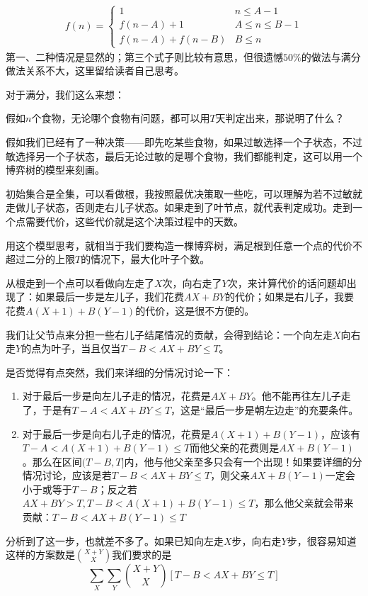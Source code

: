 \documentclass{ctexart}
\begin{document}
\begin{eqnarray*}
f(n) =
\begin{cases}
1 & n \le A-1 \\
f(n-A)+1 & A \le n \le B-1 \\
f(n-A)+f(n-B) & B \le n
\end{cases}
\end{eqnarray*}
第一、二种情况是显然的；第三个式子则比较有意思，但很遗憾$50\%$的做法与满分做法关系不大，这里留给读者自己思考。

对于满分，我们这么来想：

假如$n$个食物，无论哪个食物有问题，都可以用$T$天判定出来，那说明了什么？

假如我们已经有了一种决策——即先吃某些食物，如果过敏选择一个子状态，不过敏选择另一个子状态，最后无论过敏的是哪个食物，我们都能判定，这可以用一个博弈树的模型来刻画。

初始集合是全集，可以看做根，我按照最优决策取一些吃，可以理解为若不过敏就走做儿子状态，否则走右儿子状态。如果走到了叶节点，就代表判定成功。走到一个点需要代价，这些代价就是这个决策过程中的天数。

用这个模型思考，就相当于我们要构造一棵博弈树，满足根到任意一个点的代价不超过二分的上限$T$的情况下，最大化叶子个数。

从根走到一个点可以看做向左走了$X$次，向右走了$Y$次，来计算代价的话问题却出现了：如果最后一步是左儿子，我们花费$AX+BY$的代价；如果是右儿子，我要花费$A(X+1)+B(Y-1)$的代价，这是很不方便的。

我们让父节点来分担一些右儿子结尾情况的贡献，会得到结论：一个向左走$X$向右走$Y$的点为叶子，当且仅当$T-B < AX+BY \le T$。

是否觉得有点突然，我们来详细的分情况讨论一下：
\begin{enumerate}
\item 对于最后一步是向左儿子走的情况，花费是$AX+BY$。他不能再往左儿子走了，于是有$T-A < AX+BY \le T$，这是“最后一步是朝左边走”的充要条件。
\item 对于最后一步是向右儿子走的情况，花费是$A(X+1)+B(Y-1)$，应该有$T-A < A(X+1)+B(Y-1) \le T$而他父亲的花费则是$AX+B(Y-1)$。那么在区间$(T-B,T]$内，他与他父亲至多只会有一个出现！如果要详细的分情况讨论，应该是若$T-B < AX+BY \le T$，则父亲$AX+B(Y-1)$一定会小于或等于$T-B$；反之若$AX+BY > T,T-B < A(X+1)+B(Y-1) \le T$，那么他父亲就会带来贡献：$T-B < AX+B(Y-1) \le T$
\end{enumerate}

分析到了这一步，也就差不多了。如果已知向左走$X$步，向右走$Y$步，很容易知道这样的方案数是${{X+Y} \choose {X}}$我们要求的是
\begin{displaymath}
\sum_{X} \sum_{Y} {{X+Y} \choose {X}} [T-B < AX+BY \le T]
\end{displaymath}
\end{document}
